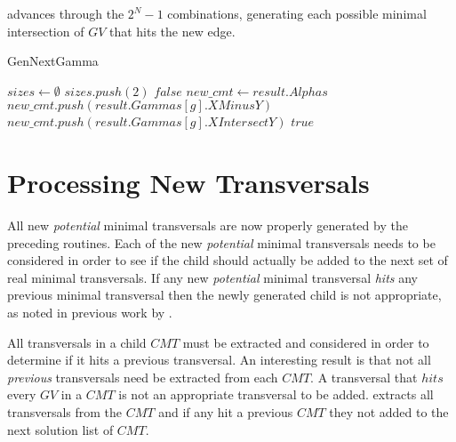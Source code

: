  advances through the $2^N -1$ combinations, generating each possible minimal intersection of $GV$ that hits the new edge. 

\begin{algorithm}[H]
    \centering
	\caption{GenNextGamma}\label{GenNextGamma}
	\begin{algorithmic}[1]
		\State $sizes \gets \emptyset$
		\State $sizes.push(2)$
		\EndFor
		\State \Return $false$
		\EndIf
		\State $new\_cmt \gets result.Alphas$
		\State $new\_cmt.push(result.Gammas[g].XMinusY)$
		\Else
		\State $new\_cmt.push(result.Gammas[g].XIntersectY)$
		\EndIf
		\EndFor
		\State \Return $true$ 
		\EndFunction
	\end{algorithmic}
\end{algorithm}

\newpage
\section{Processing New Transversals}

All new \textit{potential} minimal transversals are now properly generated by the preceding routines. Each of the new \textit{potential} minimal transversals needs to be considered in order to see if the child should actually be added to the next set of real minimal transversals. If any new \textit{potential} minimal transversal \textit{hits} any previous minimal transversal then the newly generated child is not appropriate, as noted in previous work by \cite{kavvadias1999evaluation, kavvadias2005efficient}.

All transversals in a child $CMT$ must be extracted and considered in order to determine if it  hits a previous transversal.
An interesting result is that not all \textit{previous} transversals need be extracted from each $CMT$. A transversal that $hits$ every $GV$ in a $CMT$ is not an appropriate transversal to be added.  extracts all transversals from the $CMT$ and if any hit a previous $CMT$ they not added to the next solution list of $CMT$.

